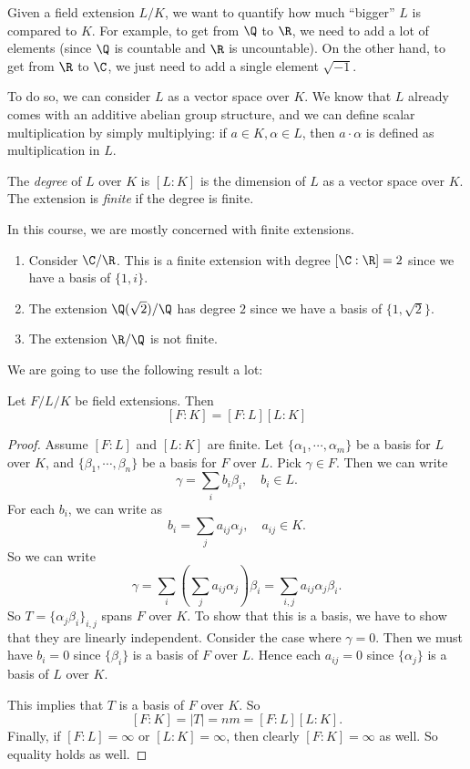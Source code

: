 \documentclass[a4paper]{article}
\begin{document}
Given a field extension $L/K$, we want to quantify how much ``bigger'' $L$ is compared to $K$. For example, to get from $\Q$ to $\R$, we need to add a lot of elements (since $\Q$ is countable and $\R$ is uncountable). On the other hand, to get from $\R$ to $\C$, we just need to add a single element $\sqrt{-1}$.

To do so, we can consider $L$ as a vector space over $K$. We know that $L$ already comes with an additive abelian group structure, and we can define scalar multiplication by simply multiplying: if $a\in K, \alpha\in L$, then $a\cdot \alpha$ is defined as multiplication in $L$.

\begin{defi}
  The \emph{degree} of $L$ over $K$ is $[L:K]$ is the dimension of $L$ as a vector space over $K$. The extension is \emph{finite} if the degree is finite.
\end{defi}
In this course, we are mostly concerned with finite extensions.

\begin{eg}\leavevmode
  \begin{enumerate}
    \item Consider $\C/\R$. This is a finite extension with degree $[\C:\R] = 2$ since we have a basis of $\{1, i\}$.
    \item The extension $\Q(\sqrt{2})/\Q$ has degree $2$ since we have a basis of $\{1, \sqrt{2}\}$.
    \item The extension $\R/\Q$ is not finite.
  \end{enumerate}
\end{eg}

We are going to use the following result a lot:
\begin{thm}
  Let $F/L/K$ be field extensions. Then
  \[
    [F:K] = [F:L][L:K]
  \]
\end{thm}

\begin{proof}
  Assume $[F:L]$ and $[L:K]$ are finite. Let $\{\alpha_1, \cdots, \alpha_m\}$ be a basis for $L$ over $K$, and $\{\beta_1, \cdots, \beta_n\}$ be a basis for $F$ over $L$. Pick $\gamma \in F$. Then we can write
  \[
    \gamma = \sum_i b_i \beta_i,\quad b_i\in L.
  \]
  For each $b_i$, we can write as
  \[
    b_i = \sum_j a_{ij}\alpha_{j},\quad a_{ij}\in K.
  \]
  So we can write
  \[
    \gamma = \sum_i \left(\sum_j a_{ij}\alpha_j\right)\beta_i = \sum_{i, j} a_{ij}\alpha_j \beta_i.
  \]
  So $T = \{\alpha_j\beta_i\}_{i, j}$ spans $F$ over $K$. To show that this is a basis, we have to show that they are linearly independent. Consider the case where $\gamma = 0$. Then we must have $b_i = 0$ since $\{\beta_i\}$ is a basis of $F$ over $L$. Hence each $a_{ij} = 0$ since $\{\alpha_j\}$ is a basis of $L$ over $K$.

  This implies that $T$ is a basis of $F$ over $K$. So
  \[
    [F:K] = |T| = nm = [F:L][L:K].
  \]
  Finally, if $[F:L] = \infty$ or $[L:K] = \infty$, then clearly $[F:K] = \infty$ as well. So equality holds as well.
\end{proof}
\end{document}
